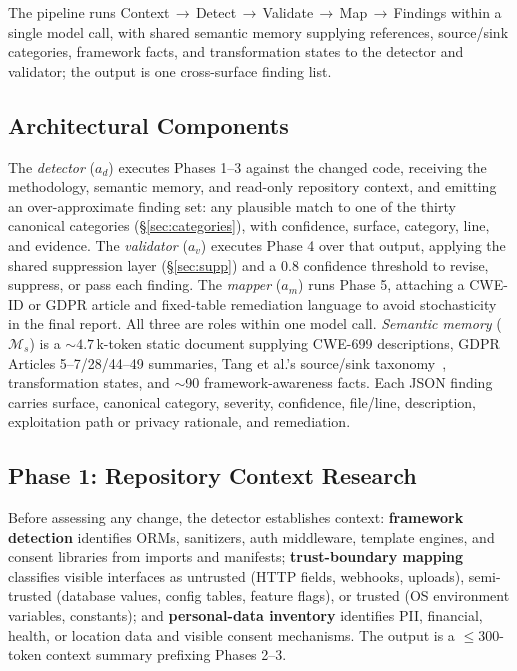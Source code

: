\documentclass[runningheads]{llncs}
\begin{document}
The pipeline runs Context\,$\rightarrow$\,Detect\,$\rightarrow$\,Validate\,$\rightarrow$\,Map\,$\rightarrow$\,Findings within a single model call, with shared semantic memory supplying references, source/sink categories, framework facts, and transformation states to the detector and validator; the output is one cross-surface finding list.

\subsection{Architectural Components}

The \emph{detector} ($a_d$) executes Phases 1--3 against the changed code, receiving the methodology, semantic memory, and read-only repository context, and emitting an over-approximate finding set: any plausible match to one of the thirty canonical categories (\S\ref{sec:categories}), with confidence, surface, category, line, and evidence. The \emph{validator} ($a_v$) executes Phase 4 over that output, applying the shared suppression layer (\S\ref{sec:supp}) and a $0.8$ confidence threshold to revise, suppress, or pass each finding. The \emph{mapper} ($a_m$) runs Phase 5, attaching a CWE-ID or GDPR article and fixed-table remediation language to avoid stochasticity in the final report. All three are roles within one model call. \emph{Semantic memory} ($\mathcal{M}_s$) is a $\sim\!4.7$\,k-token static document supplying CWE-699 descriptions, GDPR Articles 5--7/28/44--49 summaries, Tang et al.'s source/sink taxonomy~\cite{tang2023privacydata}, transformation states, and $\sim$90 framework-awareness facts. Each JSON finding carries surface, canonical category, severity, confidence, file/line, description, exploitation path or privacy rationale, and remediation.

\subsection{Phase 1: Repository Context Research}

Before assessing any change, the detector establishes context: \textbf{framework detection} identifies ORMs, sanitizers, auth middleware, template engines, and consent libraries from imports and manifests; \textbf{trust-boundary mapping} classifies visible interfaces as untrusted (HTTP fields, webhooks, uploads), semi-trusted (database values, config tables, feature flags), or trusted (OS environment variables, constants); and \textbf{personal-data inventory} identifies PII, financial, health, or location data and visible consent mechanisms. The output is a $\le\!300$-token context summary prefixing Phases 2--3.
\end{document}
